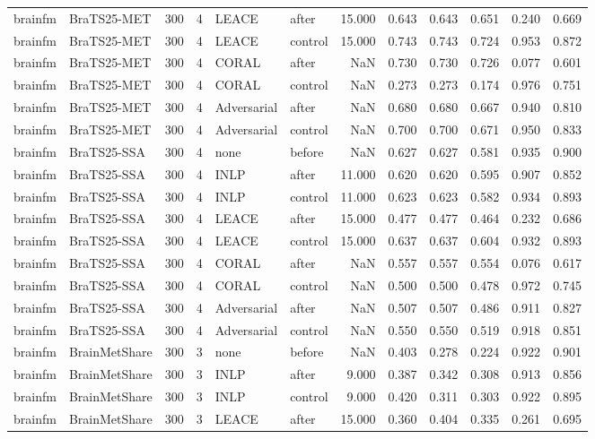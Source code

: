 \begin{tabular}{llrrllrrrrrr}
brainfm & BraTS25-MET & 300 & 4 & LEACE & after & 15.000 & 0.643 & 0.643 & 0.651 & 0.240 & 0.669 \\
brainfm & BraTS25-MET & 300 & 4 & LEACE & control & 15.000 & 0.743 & 0.743 & 0.724 & 0.953 & 0.872 \\
brainfm & BraTS25-MET & 300 & 4 & CORAL & after & NaN & 0.730 & 0.730 & 0.726 & 0.077 & 0.601 \\
brainfm & BraTS25-MET & 300 & 4 & CORAL & control & NaN & 0.273 & 0.273 & 0.174 & 0.976 & 0.751 \\
brainfm & BraTS25-MET & 300 & 4 & Adversarial & after & NaN & 0.680 & 0.680 & 0.667 & 0.940 & 0.810 \\
brainfm & BraTS25-MET & 300 & 4 & Adversarial & control & NaN & 0.700 & 0.700 & 0.671 & 0.950 & 0.833 \\
brainfm & BraTS25-SSA & 300 & 4 & none & before & NaN & 0.627 & 0.627 & 0.581 & 0.935 & 0.900 \\
brainfm & BraTS25-SSA & 300 & 4 & INLP & after & 11.000 & 0.620 & 0.620 & 0.595 & 0.907 & 0.852 \\
brainfm & BraTS25-SSA & 300 & 4 & INLP & control & 11.000 & 0.623 & 0.623 & 0.582 & 0.934 & 0.893 \\
brainfm & BraTS25-SSA & 300 & 4 & LEACE & after & 15.000 & 0.477 & 0.477 & 0.464 & 0.232 & 0.686 \\
brainfm & BraTS25-SSA & 300 & 4 & LEACE & control & 15.000 & 0.637 & 0.637 & 0.604 & 0.932 & 0.893 \\
brainfm & BraTS25-SSA & 300 & 4 & CORAL & after & NaN & 0.557 & 0.557 & 0.554 & 0.076 & 0.617 \\
brainfm & BraTS25-SSA & 300 & 4 & CORAL & control & NaN & 0.500 & 0.500 & 0.478 & 0.972 & 0.745 \\
brainfm & BraTS25-SSA & 300 & 4 & Adversarial & after & NaN & 0.507 & 0.507 & 0.486 & 0.911 & 0.827 \\
brainfm & BraTS25-SSA & 300 & 4 & Adversarial & control & NaN & 0.550 & 0.550 & 0.519 & 0.918 & 0.851 \\
brainfm & BrainMetShare & 300 & 3 & none & before & NaN & 0.403 & 0.278 & 0.224 & 0.922 & 0.901 \\
brainfm & BrainMetShare & 300 & 3 & INLP & after & 9.000 & 0.387 & 0.342 & 0.308 & 0.913 & 0.856 \\
brainfm & BrainMetShare & 300 & 3 & INLP & control & 9.000 & 0.420 & 0.311 & 0.303 & 0.922 & 0.895 \\
brainfm & BrainMetShare & 300 & 3 & LEACE & after & 15.000 & 0.360 & 0.404 & 0.335 & 0.261 & 0.695 \\

\end{tabular}
